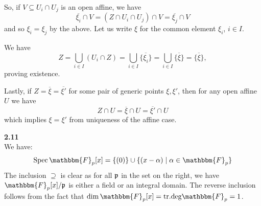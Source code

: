 \documentclass[12pt]{article}
\numberwithin{thm}{subsection}
\numberwithin{defn}{subsection}
\numberwithin{lemma}{subsection}
\numberwithin{example}{subsection}
\numberwithin{notation}{subsection}
\numberwithin{cor}{subsection}
\numberwithin{remark}{subsection}
\numberwithin{condition}{subsection}
\numberwithin{question}{subsection}
\numberwithin{construction}{subsection}
\numberwithin{construction}{subsection}
\numberwithin{construction}{subsection}
\begin{document}
So, if $V \subseteq U_i \cap U_j$ is an open affine, we have
\begin{equation}
    \overline{\xi_i} \cap V = (Z \cap U_i \cap U_j) \cap V = \overline{\xi_j} \cap V
\end{equation}
and so $\xi_i = \xi_j$ by the above. Let us write $\xi$ for the common element $\xi_i$, $i \in I$.

We have
\begin{equation*}
    Z = \bigcup_{i \in I}(U_i \cap Z) = \bigcup_{i \in I}\overline{\{\xi_i\}} = \bigcup_{i \in I}\overline{\{\xi\}} = \overline{\{\xi\}},
\end{equation*}
proving existence.

Lastly, if $Z = \overline{\xi} = \overline{\xi'}$ for some pair of generic points $\xi,\xi'$, then for any open affine $U$ we have
\begin{equation}
    Z \cap U = \overline{\xi} \cap U = \overline{\xi'} \cap U
\end{equation}
which implies $\xi = \xi'$ from uniqueness of the affine case.

\textbf{2.11}\\
We have:
\begin{equation}
    \operatorname{Spec}\mathbbm{F}_p[x] = \{(0)\} \cup \{(x-\alpha) \mid \alpha \in \mathbbm{F}_p\}
\end{equation}
The inclusion $\supseteq$ is clear as for all $\frak{p}$ in the set on the right, we have $\mathbbm{F}_p[x]/\frak{p}$ is either a field or an integral domain. The reverse inclusion follows from the fact that $\operatorname{dim}\mathbbm{F}_p[x] = \text{tr.deg}\mathbbm{F}_p = 1$.
\end{document}
